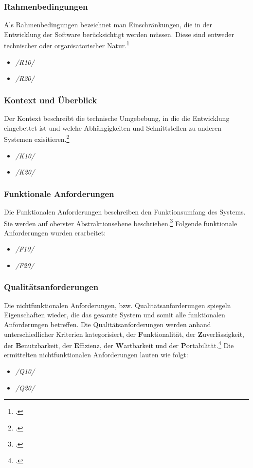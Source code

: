 \subsubsection{Rahmenbedingungen}
Als Rahmenbedingungen bezeichnet man Einschränkungen, die in der Entwicklung der Software berücksichtigt werden müssen. Diese sind entweder technischer oder organisatorischer Natur.\footcite[Vgl.][S. 459 f.]{balzert}
\begin{itemize}
    \item[] \emph{/R10/}
    \item[] \emph{/R20/}
\end{itemize}

\subsubsection{Kontext und Überblick}
Der Kontext beschreibt die technische Umgebebung, in die die Entwicklung eingebettet ist und welche Abhängigkeiten und Schnittstellen zu anderen Systemen exisitieren.\footcite[Vgl.][S. 461 f.]{balzert} 
\begin{itemize}
    \item[] \emph{/K10/}
    \item[] \emph{/K20/}
\end{itemize}

\subsubsection{Funktionale Anforderungen}
Die Funktionalen Anforderungen beschreiben den Funktionsumfang des Systems. Sie werden auf oberster Abstraktionsebene beschrieben.\footcite[Vgl.][S. 496]{balzert} Folgende funktionale Anforderungen wurden erarbeitet:
\begin{itemize}
    \item[] \emph{/F10/}
    \item[] \emph{/F20/}
\end{itemize}

\subsubsection{Qualitätsanforderungen}
Die nichtfunktionalen Anforderungen, bzw. Qualitätsanforderungen spiegeln Eigenschaften wieder, die das gesamte System und somit alle funktionalen Anforderungen betreffen. Die Qualitätsanforderungen werden anhand unterschiedlicher Kriterien kategorisiert, der \textbf{F}unktionalität, der \textbf{Z}uverlässigkeit, der \textbf{B}enutzbarkeit, der \textbf{E}ffizienz, der \textbf{W}artbarkeit und der \textbf{P}ortabilität.\footcite[Vgl.][S. 494 f.]{balzert} Die ermittelten nichtfunktionalen Anforderungen lauten wie folgt:
\begin{itemize}
    \item[] \emph{/Q10/}
    \item[] \emph{/Q20/}
\end{itemize}
